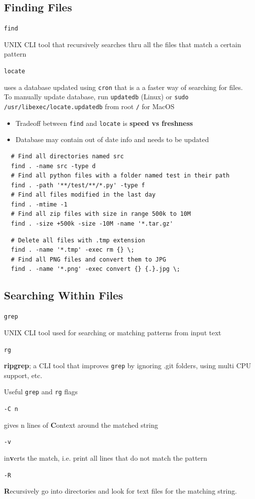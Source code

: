 \documentclass[letterpaper,12pt]{article}
\newcommand*{\lstitem}[1]{
  \setbox0\hbox{\lstinline{#1}}
  \item[\usebox0]
}
\begin{document}
\subsection{Finding Files}

\begin{description}
 \lstitem{find} UNIX CLI tool that recursively searches thru all the files that match a certain pattern
 \lstitem{locate} uses a database updated using \lstinline{cron} that is a a faster way of searching for files. To manually update database, run \lstinline{updatedb} (Linux) or \lstinline{sudo /usr/libexec/locate.updatedb} from root \lstinline{/} for MacOS
\end{description}

\begin{itemize}
 \item Tradeoff between \lstinline{find} and \lstinline{locate} is \textbf{speed vs freshness}
 \item Database may contain out of date info and needs to be updated
\end{itemize}

\begin{lstlisting}
  # Find all directories named src
  find . -name src -type d
  # Find all python files with a folder named test in their path
  find . -path '**/test/**/*.py' -type f
  # Find all files modified in the last day
  find . -mtime -1
  # Find all zip files with size in range 500k to 10M
  find . -size +500k -size -10M -name '*.tar.gz'
\end{lstlisting}

\begin{lstlisting}
  # Delete all files with .tmp extension
  find . -name '*.tmp' -exec rm {} \;
  # Find all PNG files and convert them to JPG
  find . -name '*.png' -exec convert {} {.}.jpg \;
\end{lstlisting}

\subsection{Searching Within Files}
\begin{description}
 \lstitem{grep} UNIX CLI tool used for searching or matching patterns from input text
 \lstitem{rg} \textbf{ripgrep}; a CLI tool that improves \lstinline{grep} by ignoring .git folders, using multi CPU support, etc.
\end{description}

Useful \lstinline{grep} and \lstinline{rg} flags
\begin{description}
 \lstitem{-C n} gives n lines of \textbf{C}ontext around the matched string
 \lstitem{-v} in\textbf{v}erts the match, i.e. print all lines that do not match the pattern
 \lstitem{-R} \textbf{R}ecursively go into directories and look for text files for the matching string.
\end{description}
\end{document}

